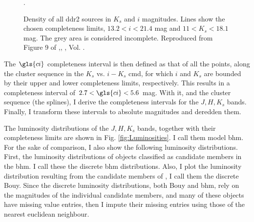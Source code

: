 \begin{figure}[htbp]
\begin{center}
\caption{Density of all \gls{ddr2} sources in $K_s$ and $i$ magnitudes. Lines show the chosen completeness limits, $13.2<i<21.4$ mag and $11<K_s<18.1$ mag. The grey area is considered incomplete. Reproduced from Figure 9 of \citet{Olivares2017},\textit{}, , Vol. .}
\label{fig:completeness}.
\end{center}
\end{figure}

The $\gls{ci}$ completeness interval is then defined as that of all the points, along the cluster sequence in the $K_s$ vs. $i-K_s$ \gls{cmd}, for which $i$ and $K_s$ are bounded by their upper and lower completeness limits, respectively. This results in a completeness interval of  $2.7<\gls{ci}<5.6$ mag. With it, and the cluster sequence (the splines), I derive the completeness intervals for the $J,H,K_s$ bands. Finally, I transform these intervals to absolute magnitudes and deredden them. 

The luminosity distributions of the $J,H,K_s$ bands, together with their completeness limits are shown in Fig. \ref{fig:Luminosities}. I call them model \gls{bhm}. For the sake of comparison, I also show the following luminosity distributions. First, the luminosity distributions of objects classified as candidate members in the \gls{bhm}. I call these the discrete \gls{bhm} distributions. Also, I plot the luminosity distribution resulting from the candidate members of \citet{Bouy2015}, I call them the discrete Bouy. Since the discrete luminosity distributions, both Bouy and \gls{bhm}, rely on the magnitudes of the individual candidate members, and many of these objects have missing value entries, then I impute their missing entries using those of the nearest euclidean neighbour. 

